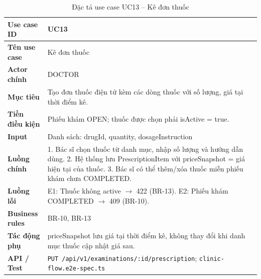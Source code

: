 \begin{table}[H]
\centering
\caption{Đặc tả use case UC13 -- Kê đơn thuốc}
\label{tab:uc13}
\begin{tabularx}{\textwidth}{|p{3.6cm}|X|}
\hline
\textbf{Use case ID} & UC13 \\
\hline
\textbf{Tên use case} & Kê đơn thuốc \\
\hline
\textbf{Actor chính} & DOCTOR \\
\hline
\textbf{Mục tiêu} & Tạo đơn thuốc điện tử kèm các dòng thuốc với số lượng, giá tại thời điểm kê. \\
\hline
\textbf{Tiền điều kiện} & Phiếu khám OPEN; thuốc được chọn phải isActive = true. \\
\hline
\textbf{Input} & Danh sách: drugId, quantity, dosageInstruction \\
\hline
\textbf{Luồng chính} & 1. Bác sĩ chọn thuốc từ danh mục, nhập số lượng và hướng dẫn dùng. 2. Hệ thống lưu PrescriptionItem với priceSnapshot = giá hiện tại của thuốc. 3. Bác sĩ có thể thêm/xóa thuốc miễn phiếu khám chưa COMPLETED. \\
\hline
\textbf{Luồng lỗi} & E1: Thuốc không active $\rightarrow$ 422 (BR-13). E2: Phiếu khám COMPLETED $\rightarrow$ 409 (BR-10). \\
\hline
\textbf{Business rules} & BR-10, BR-13 \\
\hline
\textbf{Tác động phụ} & priceSnapshot lưu giá tại thời điểm kê, không thay đổi khi danh mục thuốc cập nhật giá sau. \\
\hline
\textbf{API / Test} & \texttt{PUT /api/v1/examinations/:id/prescription}; \texttt{clinic-flow.e2e-spec.ts} \\
\hline
\end{tabularx}
\end{table}

